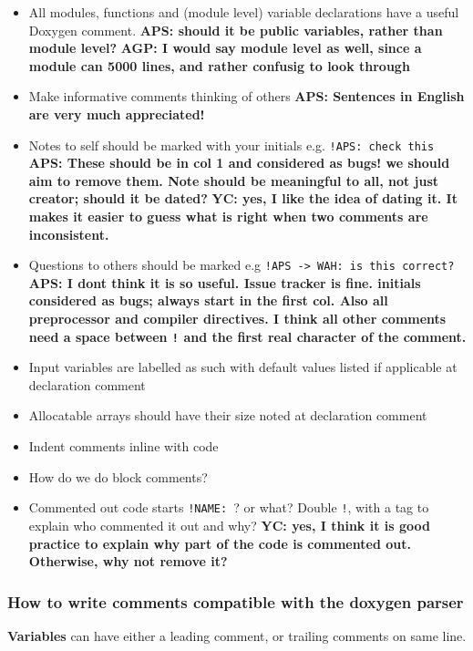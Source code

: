 \documentclass[12pt,twoside,notitlepage,a4paper]{article}
\newcommand{\code}[1]{\texttt{#1}}
\begin{document}
\begin{itemize}
\item All modules, functions and (module level) variable declarations have a useful Doxygen comment.
{\bf APS: should it be public variables, rather than module level?}
{\bf AGP: I would say module level as well, since a module can 5000 lines, and rather confusig to look through}
\item Make informative comments thinking of others {\bf APS: Sentences in English are very much appreciated!}
\item Notes to self should be marked with your initials e.g. \texttt{!APS: check this} {\bf APS: These should be in col 1 and considered as bugs! we should aim
to remove them. Note should be meaningful to all, not just creator; should it be dated?}
\textbf{YC: yes, I like the idea of dating it. It makes it easier to guess what is right when two comments are inconsistent.}
\item Questions to others should be marked e.g \texttt{!APS -> WAH: is this correct?} {\bf APS: I dont think it is so useful. Issue tracker is fine. initials 
considered as bugs; always start in the first col. Also all preprocessor and compiler directives. I think all other comments need a space between \code{!} and the first real
character of the comment.}
\item Input variables are labelled as such with default values listed if applicable at declaration comment
\item Allocatable arrays should have their size noted at declaration comment 
\item Indent comments inline with code
\item How do we do block comments?
\item Commented out code starts \code{!NAME: }? or what? Double \code{!}, with a
tag to explain who commented it out and why?
\textbf{YC: yes, I think it is good practice to explain why part of the code is commented out. Otherwise, why not remove it?}
\end{itemize}

\subsubsection{How to write comments compatible with the doxygen parser}

\textbf{Variables} can have either a leading comment, or trailing comments on same line.
\end{document}
